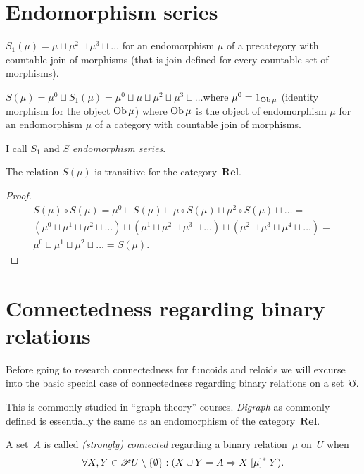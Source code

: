 \section{Endomorphism series}
\begin{defn}
$S_{1}(\mu)=\mu\sqcup\mu^{2}\sqcup\mu^{3}\sqcup\ldots$ for an endomorphism
$\mu$ of a precategory with countable join of morphisms (that is
join defined for every countable set of morphisms).
\end{defn}

\begin{defn}
$S(\mu)=\mu^{0}\sqcup S_{1}(\mu)=\mu^{0}\sqcup\mu\sqcup\mu^{2}\sqcup\mu^{3}\sqcup\ldots$where
$\mu^{0}=1_{\operatorname{Ob}\mu}$ (identity morphism for the object $\operatorname{Ob}\mu$)
where $\operatorname{Ob}\mu$ is the object of endomorphism $\mu$ for an endomorphism
$\mu$ of a category with countable join of morphisms.
\end{defn}
I call $S_{1}$ and $S$ \emph{endomorphism series}.
\begin{prop}
The relation $S(\mu)$ is transitive for the category~$\mathbf{Rel}$.\end{prop}
\begin{proof}
~
\begin{multline*}
S(\mu)\circ S(\mu)=\mu^{0}\sqcup S(\mu)\sqcup\mu\circ S(\mu)\sqcup\mu^{2}\circ S(\mu)\sqcup\dots=\\
(\mu^{0}\sqcup\mu^{1}\sqcup\mu^{2}\sqcup\dots)\sqcup(\mu^{1}\sqcup\mu^{2}\sqcup\mu^{3}\sqcup\dots)\sqcup(\mu^{2}\sqcup\mu^{3}\sqcup\mu^{4}\sqcup\dots)=\\
\mu^{0}\sqcup\mu^{1}\sqcup\mu^{2}\sqcup\dots=S(\mu).
\end{multline*}

\end{proof}

\section{Connectedness regarding binary relations}

Before going to research connectedness for funcoids and reloids we
will excurse into the basic special case of connectedness regarding
binary relations on a set~$\mho$.

This is commonly studied in ``graph theory'' courses. \emph{Digraph}
as commonly defined is essentially the same as an endomorphism of
the category~$\mathbf{Rel}$.
\begin{defn}
A set~$A$ is called
\emph{(strongly) connected} regarding a binary relation~$\mu$ on~$U$
when
\[
\forall X,Y\in\mathscr{P} U\setminus\{\emptyset\}:(X\cup Y=A\Rightarrow X\mathrel{\left[\mu\right]^{\ast}}Y).
\]

\end{defn}

